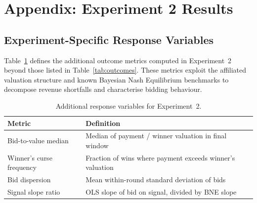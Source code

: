 \section{Appendix: Experiment 2 Results}

\subsection{Experiment-Specific Response Variables}

Table~\ref{tab:exp2_responses} defines the additional outcome metrics computed in Experiment~2 beyond those listed in Table~\ref{tab:outcomes}. These metrics exploit the affiliated valuation structure and known Bayesian Nash Equilibrium benchmarks to decompose revenue shortfalls and characterise bidding behaviour.

\begin{table}[H]
\centering
\caption{Additional response variables for Experiment~2.}
\label{tab:exp2_responses}
\begin{tabular}{l l}
\toprule
\textbf{Metric} & \textbf{Definition} \\
\midrule
Bid-to-value median & Median of payment / winner valuation in final window \\
Winner's curse frequency & Fraction of wins where payment exceeds winner's valuation \\
Bid dispersion & Mean within-round standard deviation of bids \\
Signal slope ratio & OLS slope of bid on signal, divided by BNE slope \\
\bottomrule
\end{tabular}
\end{table}

